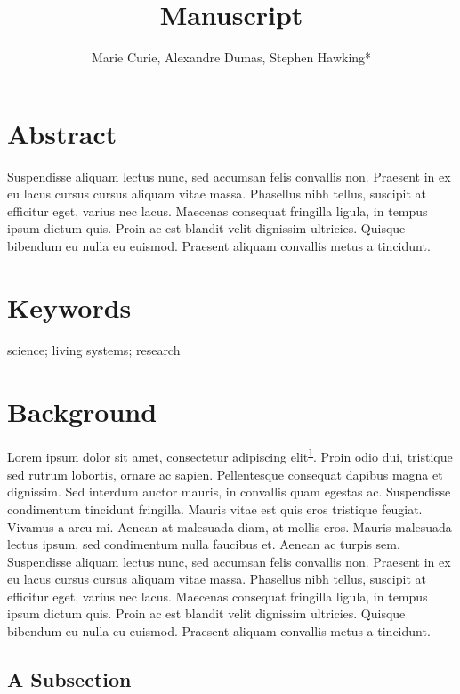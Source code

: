 \documentclass[
]{article}
\author{Marie Curie, Alexandre Dumas, Stephen Hawking*}
\affil{Department of Science, University of Space}
\affil{\normalfont {hawking@space.edu}}
\title{Manuscript}
\date{\vspace{-2.5em}}
\begin{document}
\maketitle

\hypertarget{abstract}{%
\section{Abstract}\label{abstract}}

Suspendisse aliquam lectus nunc, sed accumsan felis convallis non. Praesent in ex eu lacus cursus cursus aliquam vitae massa. Phasellus nibh tellus, suscipit at efficitur eget, varius nec lacus. Maecenas consequat fringilla ligula, in tempus ipsum dictum quis. Proin ac est blandit velit dignissim ultricies. Quisque bibendum eu nulla eu euismod. Praesent aliquam convallis metus a tincidunt.

\hypertarget{keywords}{%
\section*{Keywords}\label{keywords}}

science; living systems; research

\hypertarget{background}{%
\section{Background}\label{background}}

Lorem ipsum dolor sit amet, consectetur adipiscing elit\textsuperscript{\protect\hyperlink{ref-argandacarreras2017}{1}}. Proin odio dui, tristique sed rutrum lobortis, ornare ac sapien. Pellentesque consequat dapibus magna et dignissim. Sed interdum auctor mauris, in convallis quam egestas ac. Suspendisse condimentum tincidunt fringilla. Mauris vitae est quis eros tristique feugiat. Vivamus a arcu mi. Aenean at malesuada diam, at mollis eros. Mauris malesuada lectus ipsum, sed condimentum nulla faucibus et. Aenean ac turpis sem. Suspendisse aliquam lectus nunc, sed accumsan felis convallis non. Praesent in ex eu lacus cursus cursus aliquam vitae massa. Phasellus nibh tellus, suscipit at efficitur eget, varius nec lacus. Maecenas consequat fringilla ligula, in tempus ipsum dictum quis. Proin ac est blandit velit dignissim ultricies. Quisque bibendum eu nulla eu euismod. Praesent aliquam convallis metus a tincidunt.

\hypertarget{a-subsection}{%
\subsection{A Subsection}\label{a-subsection}}
\end{document}
